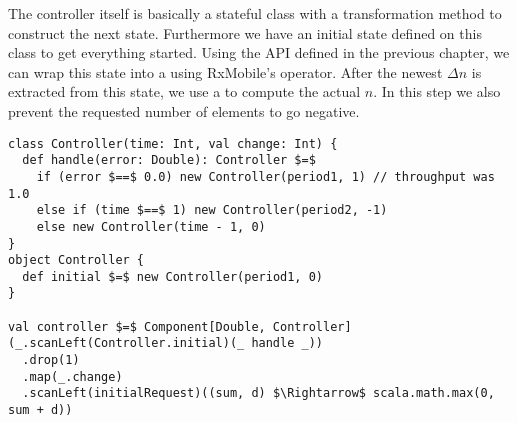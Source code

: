 The controller itself is basically a stateful class with a transformation method to construct the next state. Furthermore we have an initial state defined on this class to get everything started. Using the API defined in the previous chapter, we can wrap this state into a  using RxMobile's  operator. After the newest $\Delta n$ is extracted from this state, we use a  to compute the actual $n$. In this step we also prevent the requested number of elements to go negative.

\begin{minipage}{\linewidth}
\begin{lstlisting}[style=ScalaStyle, caption={Controller implementation for controlling the buffer}, label={lst:buffer-controller}]
class Controller(time: Int, val change: Int) {
  def handle(error: Double): Controller $=$
    if (error $==$ 0.0) new Controller(period1, 1) // throughput was 1.0
    else if (time $==$ 1) new Controller(period2, -1)
    else new Controller(time - 1, 0)
}
object Controller {
  def initial $=$ new Controller(period1, 0)
}

val controller $=$ Component[Double, Controller](_.scanLeft(Controller.initial)(_ handle _))
  .drop(1)
  .map(_.change)
  .scanLeft(initialRequest)((sum, d) $\Rightarrow$ scala.math.max(0, sum + d))
\end{lstlisting}
\end{minipage}
